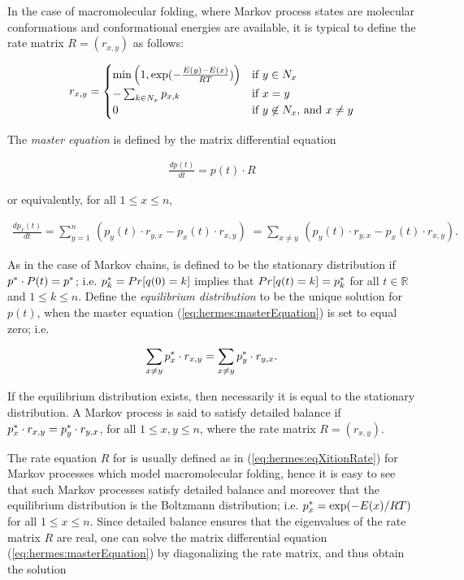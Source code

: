 \documentclass[11pt, oneside]{Thesis} %
\begin{document}
In the case of macromolecular folding, where Markov process states
are molecular conformations and conformational energies are available,
it is typical to define the rate matrix
$R = (r_{x,y})$ as follows:

\begin{align}
\label{eq:hermes:eqXitionRate}
r_{x,y} =
\begin{cases}
\min\left( 1, \boltzYmX \right)
& \text{if $y \in N_x$} \\
-\sum_{k \in N_x} p_{x,k} & \text{if $x=y$} \\
0 & \text{if $y \not\in N_x$, and $x \ne y$} \\
\end{cases}
\end{align}

The {\em master equation} is defined by the matrix differential equation

\begin{align}
\label{eq:hermes:masterEquationMatrix}
\frac{d p(t)}{dt} = p(t) \cdot R
\end{align}

or equivalently, for all $1 \leq x \leq n$,

\begin{align}
\label{eq:hermes:masterEquation}
\frac{d p_x(t)}{dt} = \sum_{y=1}^n\, (p_y(t) \cdot r_{y,x} - p_x(t) \cdot
r_{x,y})\; = \sum_{x \ne y}\, (p_y(t) \cdot r_{y,x} - p_x(t) \cdot r_{x,y}).
\end{align}

As in the case of Markov chains,
\statDist is defined to be
the stationary distribution if
$p^* \cdot P(t)= p^*$; i.e. $p^*_k = Pr[ q(0) = k ]$ implies that
$Pr[ q(t) = k] = p^*_k$ for all $t \in \mathbb{R}$ and
$1 \leq k \leq n$.
Define the {\em equilibrium distribution} \statDist
to be the unique solution for $p(t)$, when the master equation
(\ref{eq:hermes:masterEquation}) is set to equal zero; i.e.

\begin{align}
\label{eq:hermes:equilibriumTime}
\sum_{x \ne y} \pSt_x \cdot r_{x,y} = \sum_{x \ne y} \pSt_y \cdot r_{y,x}.
\end{align}

If the equilibrium distribution exists, then necessarily it is equal to
the stationary distribution. A Markov process is said
to satisfy detailed balance if $p^*_x \cdot r_{x,y} = p^*_y \cdot r_{y,x}$,
for all $1 \leq x,y \leq n$, where the rate matrix $R = (r_{x,y})$.

The rate equation $R$ for is usually defined
as in (\ref{eq:hermes:eqXitionRate}) for
Markov processes which model macromolecular folding,
hence it is easy to see that
such Markov processes satisfy detailed balance and moreover that
the equilibrium distribution is the
Boltzmann distribution; i.e.  $p^*_x = \exp(-E(x)/RT)$ for
all $1 \leq x \leq n$.
Since detailed balance ensures that the eigenvalues of the rate matrix $R$ are
real, one can solve the matrix differential equation
(\ref{eq:hermes:masterEquation}) by diagonalizing the rate matrix, and thus obtain
the solution
\end{document}
